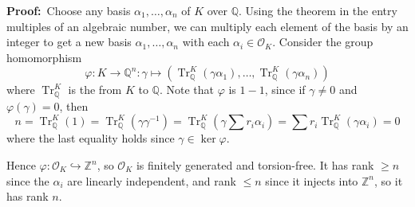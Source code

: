 \documentclass[12pt]{article}
\newcommand{\Ints}{\mathbb{Z}}
\newcommand{\Rats}{\mathbb{Q}}
\begin{document}
\textbf{Proof:}\,
Choose any basis $\alpha_1,\ldots,\alpha_n$ of $K$ over $\Rats$. Using the theorem in the entry multiples of an algebraic number, we can multiply each element of the basis by an integer to get a new basis $\alpha_1,\ldots,\alpha_n$ with each $\alpha_i\in\mathcal{O}_K$.
\newline
Consider the group homomorphism
\[\varphi:K\rightarrow \Rats^n:\gamma\mapsto(\operatorname{Tr}_\Rats^K(\gamma\alpha_1),\ldots,\operatorname{Tr}_\Rats^K(\gamma\alpha_n))\]
where $\operatorname{Tr}_\Rats^K$ is the  from $K$ to $\Rats$. Note that $\varphi$ is $1-1$, since if $\gamma\neq 0$ and $\varphi(\gamma)=0$, then 
\[n=\operatorname{Tr}_\Rats^K(1)=\operatorname{Tr}_\Rats^K(\gamma\gamma^{-1})=\operatorname{Tr}_\Rats^K(\gamma\sum r_i\alpha_i)=\sum r_i \operatorname{Tr}_\Rats^K(\gamma\alpha_i)=0\]
where the last equality holds since $\gamma\in\ker\varphi$.

Hence $\varphi:\mathcal{O}_K\hookrightarrow \Ints^n$, so $\mathcal{O}_K$ is finitely generated and torsion-free. It has rank $\geq n$ since the $\alpha_i$ are linearly independent, and rank $\leq n$ since it injects into $\Ints^n$, so it has rank $n$.

\end{document}
